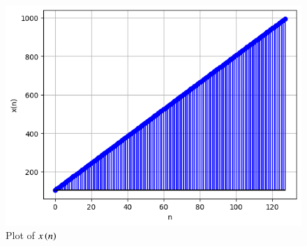 \documentclass[journal,12pt,twocolumn]{IEEEtran}
\theoremstyle{remark}
\begin{document}
\begin{figure}[!ht]
\centering
\begin{center}
\includegraphics[width=\columnwidth]{figs/Fig1}
\caption{Plot of $x\left(n\right)$}
\end{center}
\end{figure}
	
\end{document}
